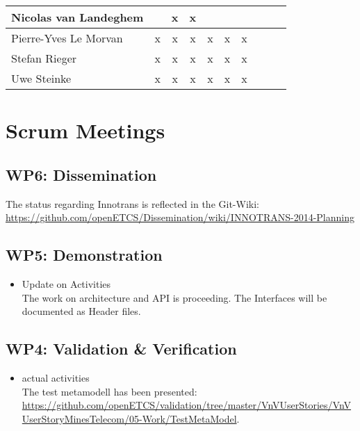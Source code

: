 \documentclass[a4paper, 11pt]{article}
\begin{document}
\begin{tabular}{|l|c|c|c||c|c|c||c|c|c|}
Nicolas van Landeghem&   & x & x &   &   &   \\\hline
Pierre-Yves Le Morvan& x & x & x & x & x & x \\\hline
Stefan Rieger        & x & x & x & x & x & x \\\hline
Uwe Steinke          & x & x & x & x & x & x \\\hline
\end{tabular}


\section{Scrum Meetings}

\subsection{WP6: Dissemination}

The status regarding Innotrans is reflected in the Git-Wiki: \url{https://github.com/openETCS/Dissemination/wiki/INNOTRANS-2014-Planning}

\subsection{WP5: Demonstration}
\begin{itemize}
\item Update on Activities\\

The work on architecture and API is proceeding. The Interfaces will be documented as Header files. 

\end{itemize}


\subsection{WP4: Validation \& Verification}
\begin{itemize}
\item actual activities\\
The test metamodell has been presented: \url{https://github.com/openETCS/validation/tree/master/VnVUserStories/VnVUserStoryMinesTelecom/05-Work/TestMetaModel}.

\end{itemize}
\end{document}
